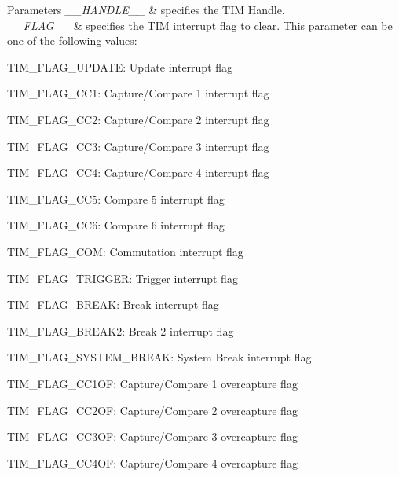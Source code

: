 \begin{DoxyParams}{Parameters}
{\em \+\_\+\+\_\+\+H\+A\+N\+D\+L\+E\+\_\+\+\_\+} & specifies the T\+IM Handle. \\
\hline
{\em \+\_\+\+\_\+\+F\+L\+A\+G\+\_\+\+\_\+} & specifies the T\+IM interrupt flag to clear. This parameter can be one of the following values\+: \begin{DoxyItemize}
\item T\+I\+M\+\_\+\+F\+L\+A\+G\+\_\+\+U\+P\+D\+A\+TE\+: Update interrupt flag \item T\+I\+M\+\_\+\+F\+L\+A\+G\+\_\+\+C\+C1\+: Capture/\+Compare 1 interrupt flag \item T\+I\+M\+\_\+\+F\+L\+A\+G\+\_\+\+C\+C2\+: Capture/\+Compare 2 interrupt flag \item T\+I\+M\+\_\+\+F\+L\+A\+G\+\_\+\+C\+C3\+: Capture/\+Compare 3 interrupt flag \item T\+I\+M\+\_\+\+F\+L\+A\+G\+\_\+\+C\+C4\+: Capture/\+Compare 4 interrupt flag \item T\+I\+M\+\_\+\+F\+L\+A\+G\+\_\+\+C\+C5\+: Compare 5 interrupt flag \item T\+I\+M\+\_\+\+F\+L\+A\+G\+\_\+\+C\+C6\+: Compare 6 interrupt flag \item T\+I\+M\+\_\+\+F\+L\+A\+G\+\_\+\+C\+OM\+: Commutation interrupt flag \item T\+I\+M\+\_\+\+F\+L\+A\+G\+\_\+\+T\+R\+I\+G\+G\+ER\+: Trigger interrupt flag \item T\+I\+M\+\_\+\+F\+L\+A\+G\+\_\+\+B\+R\+E\+AK\+: Break interrupt flag ~\newline
 \item T\+I\+M\+\_\+\+F\+L\+A\+G\+\_\+\+B\+R\+E\+A\+K2\+: Break 2 interrupt flag ~\newline
 \item T\+I\+M\+\_\+\+F\+L\+A\+G\+\_\+\+S\+Y\+S\+T\+E\+M\+\_\+\+B\+R\+E\+AK\+: System Break interrupt flag \item T\+I\+M\+\_\+\+F\+L\+A\+G\+\_\+\+C\+C1\+OF\+: Capture/\+Compare 1 overcapture flag \item T\+I\+M\+\_\+\+F\+L\+A\+G\+\_\+\+C\+C2\+OF\+: Capture/\+Compare 2 overcapture flag \item T\+I\+M\+\_\+\+F\+L\+A\+G\+\_\+\+C\+C3\+OF\+: Capture/\+Compare 3 overcapture flag \item T\+I\+M\+\_\+\+F\+L\+A\+G\+\_\+\+C\+C4\+OF\+: Capture/\+Compare 4 overcapture flag \end{DoxyItemize}
\\
\hline
\end{DoxyParams}

